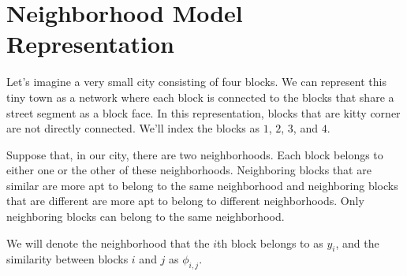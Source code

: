 \section*{Neighborhood Model Representation}
Let's imagine a very small city consisting of four blocks. We can
represent this tiny town as a network where each block is connected
to the blocks that share a street segment as a block face. In this
representation, blocks that are kitty corner are not directly
connected. We'll index the blocks as $1$, $2$, $3$, and $4$.

\begin{figure}[h]
\centering
{}
\end{figure}

\begin{figure}[h]
\centering


\end{figure}

Suppose that, in our city, there are two neighborhoods. Each block
belongs to either one or the other of these neighborhoods. Neighboring
blocks that are similar are more apt to belong to the same
neighborhood and neighboring blocks that are different are more apt to
belong to different neighborhoods. Only neighboring blocks can belong
to the same neighborhood.

We will denote the neighborhood that the $i$th block belongs to as
$y_i$, and the similarity between blocks $i$ and $j$ as $\phi_{i,j}$.

\begin{figure}[!h]
\centering


\end{figure}

